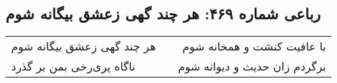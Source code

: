 \begin{center}
\section*{رباعی شماره ۴۶۹: هر چند گهی زعشق بیگانه شوم}
\label{sec:sh469}
\begin{longtable}{l p{0.5cm} r}
هر چند گهی زعشق بیگانه شوم
&&
با عافیت کنشت و همخانه شوم
\\
ناگاه پری‌رخی بمن بر گذرد
&&
برگردم زان حدیث و دیوانه شوم
\\
\end{longtable}
\end{center}
